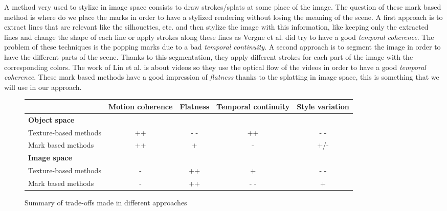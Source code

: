 A method very used to stylize in image space consists to draw strokes/splats at some place of the image\cite{bleron_motion-coherent_2018, vergne_implicit_2011, benard_active_nodate, zeng_image_2009, grabli_programmable_2010}. The question of these mark based method is where do we place the marks in order to have a stylized rendering without losing the meaning of the scene. A first approach is to extract lines that are relevant like the silhouettes, etc. \cite{vergne_implicit_2011, grabli_programmable_2010, lee_line_nodate} and then stylize the image with this information, like keeping only the extracted lines and change the shape of each line or apply strokes along these lines as Vergne et al.\cite{vergne_implicit_2011} did try to have a good \textit{temporal coherence}. The problem of these techniques is the popping marks due to a bad \textit{temporal continuity}.
A second approach is to segment the image in order to have the different parts of the scene\cite{zeng_image_2009, lin_video_nodate}. Thanks to this segmentation, they apply different strokes for each part of the image with the corresponding colors. The work of Lin et al.\cite{lin_video_nodate} is about videos so they use the optical flow of the videos in order to have a good \textit{temporal coherence}. These mark based methods have a good impression of \textit{flatness} thanks to the splatting in image space, this is something that we will use in our approach.


\begin{figure}

    \begin{tabular}{|l|*{4}{c|}}
    \hline
         & \textbf{Motion coherence} & \textbf{Flatness} & \textbf{Temporal continuity} & \textbf{Style variation} \\
    \hline
    \textbf{Object space} & & & & \\
    \hline
    Texture-based methods & ++ & - - & ++ & - - \\
    \hline
    Mark based methods & ++ & + & - & +/- \\
    \hline
    \textbf{Image space} & & & & \\
    \hline
    Texture-based methods & -  & ++ & + & - - \\
    \hline
    Mark based methods & - & ++ & - - & + \\
    \hline
    \end{tabular}

    \caption{Summary of trade-offs made in different approaches}
    \label{tableau_comparatif}
\end{figure}
